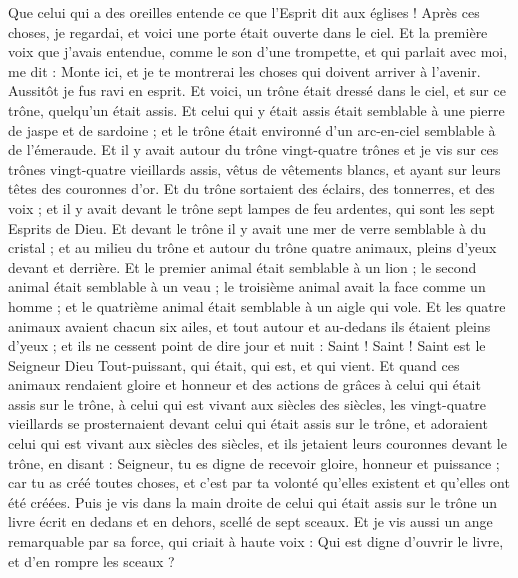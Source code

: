 \begin{multicols}{2}
Que celui qui a des oreilles entende ce que l'Esprit dit aux églises !
\VerseOne{}Après ces choses, je regardai, et voici une porte était ouverte dans le ciel. Et la première voix que j'avais entendue, comme le son d'une trompette, et qui parlait avec moi, me dit : Monte ici, et je te montrerai les choses qui doivent arriver à l'avenir.
Aussitôt je fus ravi en esprit. Et voici, un trône était dressé dans le ciel, et sur ce trône, quelqu'un était assis.
Et celui qui y était assis était semblable à une pierre de jaspe et de sardoine ; et le trône était environné d'un arc-en-ciel semblable à de l'émeraude.
Et il y avait autour du trône vingt-quatre trônes et je vis sur ces trônes vingt-quatre vieillards assis, vêtus de vêtements blancs, et ayant sur leurs têtes des couronnes d'or.
Et du trône sortaient des éclairs, des tonnerres, et des voix ; et il y avait devant le trône sept lampes de feu ardentes, qui sont les sept Esprits de Dieu.
Et devant le trône il y avait une mer de verre semblable à du cristal ; et au milieu du trône et autour du trône quatre animaux, pleins d'yeux devant et derrière.
Et le premier animal était semblable à un lion ; le second animal était semblable à un veau ; le troisième animal avait la face comme un homme ; et le quatrième animal était semblable à un aigle qui vole.
Et les quatre animaux avaient chacun six ailes, et tout autour et au-dedans ils étaient pleins d'yeux ; et ils ne cessent point de dire jour et nuit : Saint ! Saint ! Saint est le Seigneur Dieu Tout-puissant, qui était, qui est, et qui vient.
Et quand ces animaux rendaient gloire et honneur et des actions de grâces à celui qui était assis sur le trône, à celui qui est vivant aux siècles des siècles,
les vingt-quatre vieillards se prosternaient devant celui qui était assis sur le trône, et adoraient celui qui est vivant aux siècles des siècles, et ils jetaient leurs couronnes devant le trône, en disant :
Seigneur, tu es digne de recevoir gloire, honneur et puissance ; car tu as créé toutes choses, et c'est par ta volonté qu'elles existent et qu'elles ont été créées.
\VerseOne{}Puis je vis dans la main droite de celui qui était assis sur le trône un livre écrit en dedans et en dehors, scellé de sept sceaux.
Et je vis aussi un ange remarquable par sa force, qui criait à haute voix : Qui est digne d'ouvrir le livre, et d'en rompre les sceaux ?

\end{multicols}
